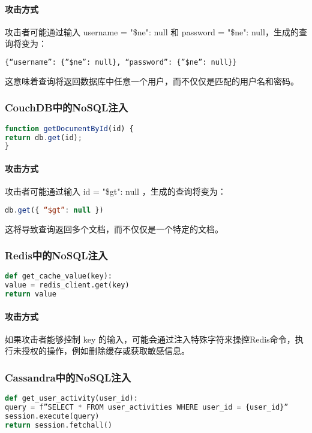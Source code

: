 \documentclass{article}
\begin{document}
\paragraph{攻击方式}
攻击者可能通过输入 username = {"\$ne": null} 和 password = {"\$ne": null}，生成的查询将变为：
\begin{lstlisting}[language=Python]
{“username”: {”$ne”: null}, “password”: {”$ne”: null}}
\end{lstlisting}
这意味着查询将返回数据库中任意一个用户，而不仅仅是匹配的用户名和密码。

\subsubsection{CouchDB中的NoSQL注入}
\begin{lstlisting}[language=JavaScript, caption=存在NoSQL注入漏洞的CouchDB代码]
function getDocumentById(id) {
return db.get(id);
}
\end{lstlisting}

\paragraph{攻击方式}
攻击者可能通过输入 id = { "\$gt": null }，生成的查询将变为：
\begin{lstlisting}[language=JavaScript]
db.get({ “$gt”: null })
\end{lstlisting}
这将导致查询返回多个文档，而不仅仅是一个特定的文档。

\subsubsection{Redis中的NoSQL注入}
\begin{lstlisting}[language=Python, caption=Redis中的NoSQL注入]
def get_cache_value(key):
value = redis_client.get(key)
return value
\end{lstlisting}

\paragraph{攻击方式}
如果攻击者能够控制 key 的输入，可能会通过注入特殊字符来操控Redis命令，执行未授权的操作，例如删除缓存或获取敏感信息。

\subsubsection{Cassandra中的NoSQL注入}
\begin{lstlisting}[language=Python, caption=Cassandra中的NoSQL注入]
def get_user_activity(user_id):
query = f”SELECT * FROM user_activities WHERE user_id = {user_id}”
session.execute(query)
return session.fetchall()
\end{lstlisting}
\end{document}
